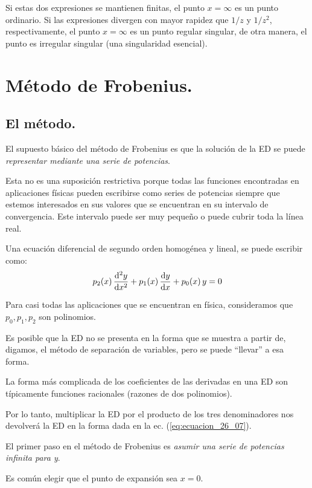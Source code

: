 \documentclass[12pt]{article}
\numberwithin{equation}{section}
\begin{document}
Si estas dos expresiones se mantienen finitas, el punto $x = \infty$ es un punto ordinario. Si las expresiones divergen con mayor rapidez que $1/z$ y $1/z^{2}$, respectivamente, el punto $x = \infty$ es un punto regular singular, de otra manera, el punto es irregular singular (una singularidad esencial).

\section{Método de Frobenius.}
\subsection{El método.}

El supuesto básico del método de Frobenius es que la solución de la ED se puede \emph{representar mediante una serie de potencias}.
\par
Esta no es una suposición restrictiva porque todas las funciones encontradas en aplicaciones físicas pueden escribirse como series de potencias siempre que estemos interesados en sus valores que se encuentran en su intervalo de convergencia. Este intervalo puede ser muy pequeño o puede cubrir toda la línea real.

Una ecuación diferencial de segundo orden homogénea y lineal, se puede escribir como:
\begin{align}
p_{2} (x) \, \dv[2]{y}{x} + p_{1} (x) \, \dv{y}{x} + p_{0} (x) \, y = 0
\label{eq:ecuacion_26_07}    
\end{align}

Para casi todas las aplicaciones que se encuentran en física, consideramos que $p_{0}, p_{1}, p_{2}$ son polinomios.

Es posible que la ED no se presenta en la forma que se muestra a partir de, digamos, el método de separación de variables, pero se puede \enquote{llevar} a esa forma.

La forma más complicada de los coeficientes de las derivadas en una ED son típicamente funciones racionales (razones de dos polinomios).

Por lo tanto, multiplicar la ED por el producto de los tres denominadores nos devolverá la ED en la forma dada en la ec. (\ref{eq:ecuacion_26_07}).

El primer paso en el método de Frobenius es \emph{asumir una serie de potencias infinita para y}.

Es común elegir que el punto de expansión sea $x = 0$.
\end{document}
